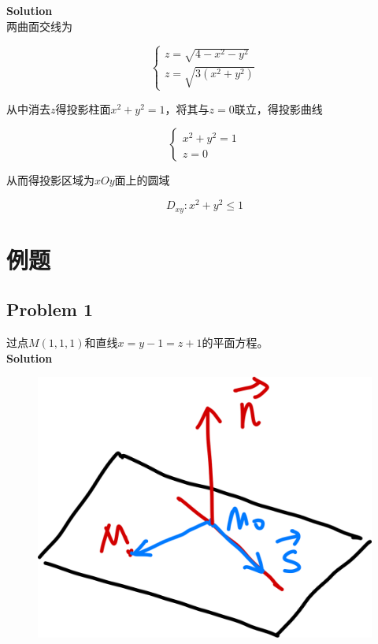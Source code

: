 \documentclass[
	11pt, %
	a4paper, %
]{WhuSakuraBook}
\begin{document}
    \textbf{Solution}
    \\

    两曲面交线为

    $$
        \left\{\begin{array}{l}
        z=\sqrt{4-x^2-y^2} \\
        z=\sqrt{3\left(x^2+y^2\right)}
        \end{array}\right.
    $$

    从中消去\(z\)得投影柱面\(x^2 + y^2 = 1\)，将其与\(z=0\)联立，得投影曲线

    $$
        \left\{\begin{array}{l}
        x^2+y^2=1 \\
        z=0
        \end{array}\right.
    $$

    从而得投影区域为\(xOy\)面上的圆域

    $$
    D_{xy}: x^2 + y^2 \leq 1
    $$

\section{例题}

\subsection{Problem 1}

    过点\(M\left(1,1,1\right)\)和直线\(x=y-1=z+1\)的平面方程。
    \\

    \textbf{Solution}
    \\

    \begin{figure}
        \centering
        \includegraphics[scale=0.06]{"Chapter 08 images/pic19.png"}
        \label{pic19}
    \end{figure}
\end{document}
